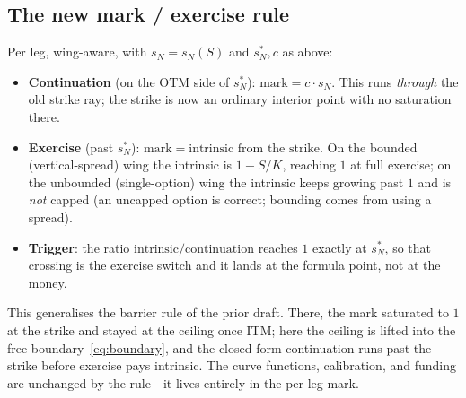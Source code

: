 \documentclass[11pt]{article}
\begin{document}
\subsection{The new mark / exercise rule}
Per leg, wing-aware, with $s_{N}=s_{N}(S)$ and $s_{N}^{\ast},c$ as above:
\begin{itemize}[leftmargin=2em]
  \item \textbf{Continuation} (on the OTM side of $s_{N}^{\ast}$):
        $\mathrm{mark}=c\cdot s_{N}$. This runs \emph{through} the old strike ray;
        the strike is now an ordinary interior point with no saturation there.
  \item \textbf{Exercise} (past $s_{N}^{\ast}$): $\mathrm{mark}=\text{intrinsic
        from the strike}$. On the bounded (vertical-spread) wing the intrinsic is
        $1-S/K$, reaching $1$ at full exercise; on the unbounded (single-option)
        wing the intrinsic keeps growing past $1$ and is \emph{not} capped (an
        uncapped option is correct; bounding comes from using a spread).
  \item \textbf{Trigger}: the ratio $\text{intrinsic}/\text{continuation}$ reaches
        $1$ exactly at $s_{N}^{\ast}$, so that crossing is the exercise switch and
        it lands at the formula point, not at the money.
\end{itemize}
This generalises the barrier rule of the prior draft. There, the mark saturated
to $1$ at the strike and stayed at the ceiling once ITM; here the ceiling is
lifted into the free boundary~\eqref{eq:boundary}, and the closed-form
continuation runs past the strike before exercise pays intrinsic. The curve
functions, calibration, and funding are unchanged by the rule---it lives entirely
in the per-leg mark.
\end{document}
